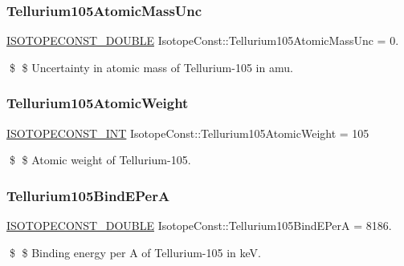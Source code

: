 \subsubsection{\texorpdfstring{Tellurium105\+Atomic\+Mass\+Unc}{Tellurium105AtomicMassUnc}}
{\footnotesize\ttfamily \mbox{\hyperlink{group___isotope_const-_macros_ga8f45a7272ce02c0b4c65c44636ed719a}{I\+S\+O\+T\+O\+P\+E\+C\+O\+N\+S\+T\+\_\+\+D\+O\+U\+B\+LE}} Isotope\+Const\+::\+Tellurium105\+Atomic\+Mass\+Unc = 0.}

\$ \$ Uncertainty in atomic mass of Tellurium-\/105 in amu. \mbox{\label{group___isotope_const-_tellurium-_te105_ga41f887e29a1480e252245d287bc1fd91}} 
\subsubsection{\texorpdfstring{Tellurium105\+Atomic\+Weight}{Tellurium105AtomicWeight}}
{\footnotesize\ttfamily \mbox{\hyperlink{group___isotope_const-_macros_ga5f18360b3e99483a35c32d789e62621c}{I\+S\+O\+T\+O\+P\+E\+C\+O\+N\+S\+T\+\_\+\+I\+NT}} Isotope\+Const\+::\+Tellurium105\+Atomic\+Weight = 105}

\$ \$ Atomic weight of Tellurium-\/105. \mbox{\label{group___isotope_const-_tellurium-_te105_ga7ab7805344e294a834bea999c8c9df5b}} 
\subsubsection{\texorpdfstring{Tellurium105\+Bind\+E\+PerA}{Tellurium105BindEPerA}}
{\footnotesize\ttfamily \mbox{\hyperlink{group___isotope_const-_macros_ga8f45a7272ce02c0b4c65c44636ed719a}{I\+S\+O\+T\+O\+P\+E\+C\+O\+N\+S\+T\+\_\+\+D\+O\+U\+B\+LE}} Isotope\+Const\+::\+Tellurium105\+Bind\+E\+PerA = 8186.}

\$ \$ Binding energy per A of Tellurium-\/105 in keV. \mbox{\label{group___isotope_const-_tellurium-_te105_gacb142cbee76af5a770ad400dfe380c35}} 
